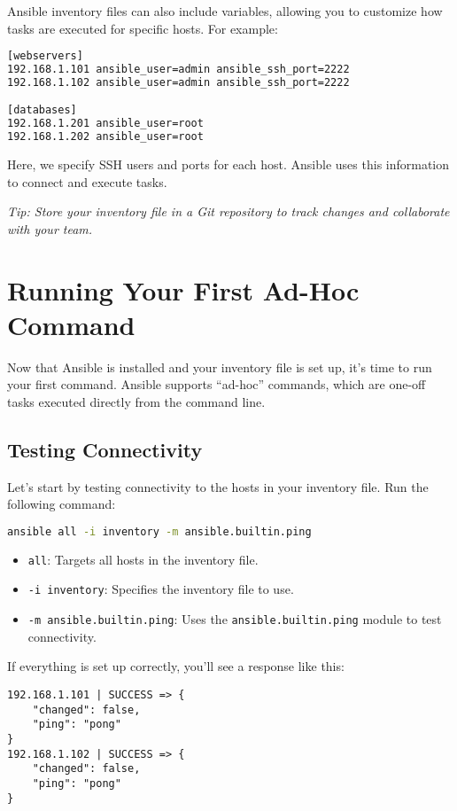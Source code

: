 Ansible inventory files can also include variables, allowing you to customize how tasks are executed for specific hosts. For example:

\begin{lstlisting}[language=bash, caption=Inventory File with Variables]
[webservers]
192.168.1.101 ansible_user=admin ansible_ssh_port=2222
192.168.1.102 ansible_user=admin ansible_ssh_port=2222

[databases]
192.168.1.201 ansible_user=root
192.168.1.202 ansible_user=root
\end{lstlisting}

Here, we specify SSH users and ports for each host. Ansible uses this information to connect and execute tasks.

\textit{Tip: Store your inventory file in a Git repository to track changes and collaborate with your team.}

\section{Running Your First Ad-Hoc Command}

Now that Ansible is installed and your inventory file is set up, it's time to run your first command. Ansible supports “ad-hoc” commands, which are one-off tasks executed directly from the command line.

\subsection{Testing Connectivity}

Let's start by testing connectivity to the hosts in your inventory file. Run the following command:
\begin{lstlisting}[language=bash, caption=Ping All Hosts in Inventory]
ansible all -i inventory -m ansible.builtin.ping
\end{lstlisting}

\begin{itemize}
    \item \texttt{all}: Targets all hosts in the inventory file.
    \item \texttt{-i inventory}: Specifies the inventory file to use.
    \item \texttt{-m ansible.builtin.ping}: Uses the \texttt{ansible.builtin.ping} module to test connectivity.
\end{itemize}

If everything is set up correctly, you'll see a response like this:
\begin{lstlisting}[language=plain, caption=Ping Command Output]
192.168.1.101 | SUCCESS => {
    "changed": false,
    "ping": "pong"
}
192.168.1.102 | SUCCESS => {
    "changed": false,
    "ping": "pong"
}
\end{lstlisting}

